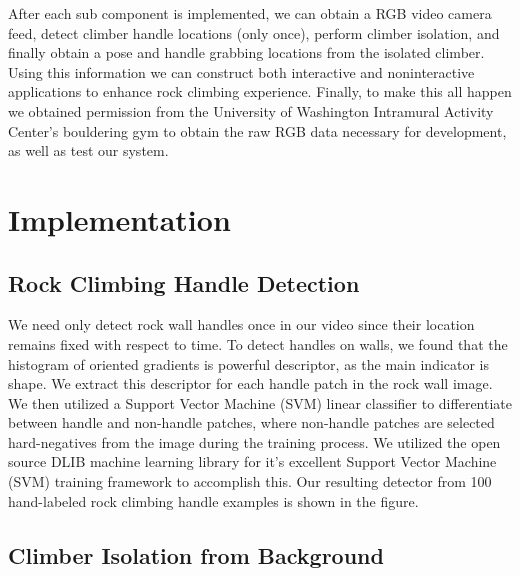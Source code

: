 \documentclass{chi2009}
\begin{document}
After each sub component is implemented, we can obtain a RGB video camera feed, detect climber handle locations (only once), perform climber isolation, and finally obtain a pose and handle grabbing locations from the isolated climber. Using this information we can construct both interactive and noninteractive applications to enhance rock climbing experience. Finally, to make this all happen we obtained permission from the University of Washington Intramural Activity Center's bouldering gym to obtain the raw RGB data necessary for development, as well as test our system.

\section{Implementation}

\subsection{Rock Climbing Handle Detection}

We need only detect rock wall handles once in our video since their location remains fixed with respect to time. To detect handles on walls, we found that the histogram of oriented gradients is powerful descriptor, as the main indicator is shape. We extract this descriptor for each handle patch in the rock wall image. We then utilized a Support Vector Machine (SVM) linear classifier to differentiate between handle and non-handle patches, where non-handle patches are selected hard-negatives from the image during the training process. We utilized the open source DLIB machine learning library for it's excellent Support Vector Machine (SVM) training framework to accomplish this. Our resulting detector from 100 hand-labeled rock climbing handle examples is shown in the figure.

\subsection{Climber Isolation from Background}
\end{document}
